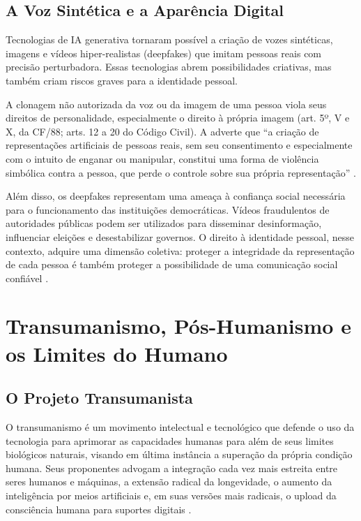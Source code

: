 \subsection{A Voz Sintética e a Aparência Digital}
\label{subsec:voz-sintetica}

Tecnologias de IA generativa tornaram possível a criação de vozes sintéticas, imagens e vídeos hiper-realistas (deepfakes) que imitam pessoas reais com precisão perturbadora. Essas tecnologias abrem possibilidades criativas, mas também criam riscos graves para a identidade pessoal.

A clonagem não autorizada da voz ou da imagem de uma pessoa viola seus direitos de personalidade, especialmente o direito à própria imagem (art. 5º, V e X, da CF/88; arts. 12 a 20 do Código Civil). A \MH{} adverte que ``a criação de representações artificiais de pessoas reais, sem seu consentimento e especialmente com o intuito de enganar ou manipular, constitui uma forma de violência simbólica contra a pessoa, que perde o controle sobre sua própria representação'' \cite{LeaoXIV2026MH}.

Além disso, os deepfakes representam uma ameaça à confiança social necessária para o funcionamento das instituições democráticas. Vídeos fraudulentos de autoridades públicas podem ser utilizados para disseminar desinformação, influenciar eleições e desestabilizar governos. O direito à identidade pessoal, nesse contexto, adquire uma dimensão coletiva: proteger a integridade da representação de cada pessoa é também proteger a possibilidade de uma comunicação social confiável \cite{Chesney2019DF, Pariser2022THP}.

\section{Transumanismo, Pós-Humanismo e os Limites do Humano}
\label{sec:agencia-moral}

\subsection{O Projeto Transumanista}
\label{subsec:projeto-transumanista}

O transumanismo é um movimento intelectual e tecnológico que defende o uso da tecnologia para aprimorar as capacidades humanas para além de seus limites biológicos naturais, visando em última instância a superação da própria condição humana. Seus proponentes advogam a integração cada vez mais estreita entre seres humanos e máquinas, a extensão radical da longevidade, o aumento da inteligência por meios artificiais e, em suas versões mais radicais, o upload da consciência humana para suportes digitais \cite{Bostrom2005TH, Kurzweil2005THS}.

